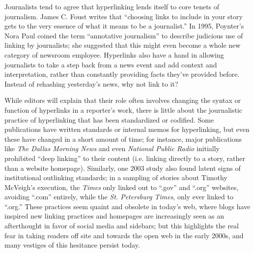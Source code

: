 Journalists tend to agree that hyperlinking lends itself to core tenets of journalism. James C. Foust writes that ``choosing links to include in your story gets to the very essence of what it means to be a journalist.''\autocite[161]{foust_online_2009} In 1995, Poynter's Nora Paul coined the term ``annotative journalism'' to describe judicious use of linking by journalists; she suggested that this might even become a whole new category of newsroom employee.\autocite{paul_content:_1995} Hyperlinks also have a hand in allowing journalists to take a step back from a news event and add context and interpretation, rather than constantly providing facts they've provided before. Instead of rehashing yesterday's news, why not link to it?

While editors will explain that their role often involves changing the syntax or function of hyperlinks in a reporter's work, there is little about the journalistic practice of hyperlinking that has been standardized or codified. Some publications have written standards or internal memos for hyperlinking, but even these have changed in a short amount of time; for instance, major publications like \emph{The Dallas Morning News} and even \emph{National Public Radio} initially prohibited ``deep linking'' to their content (i.e. linking directly to a story, rather than a website homepage).\autocite[49]{li_applying_2013} Similarly, one 2003 study also found latent signs of institutional outlinking standards; in a sampling of stories about Timothy McVeigh's execution, the \emph{Times} only linked out to  ``.gov'' and ``.org'' websites, avoiding ``.com'' entirely, while the \emph{St. Petersburg Times}, only ever linked to ``.org.''\autocite[410]{dimitrova_hyperlinking_2003} These practices seem quaint and obsolete in today's web, where blogs have inspired new linking practices and homepages are increasingly seen as an afterthought in favor of social media and sidebars; but this highlights the real fear in taking readers off site and towards the open web in the early 2000s, and many vestiges of this hesitance persist today.

